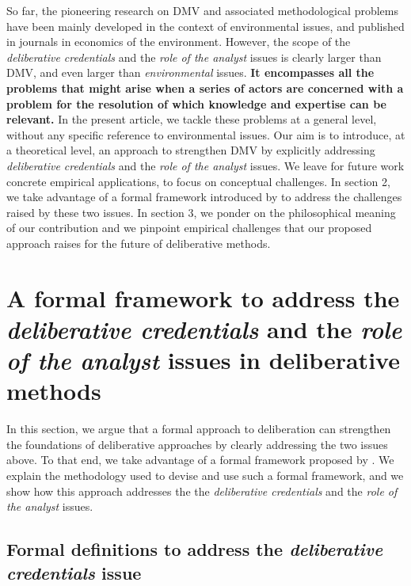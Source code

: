 \documentclass[a4paper, 11pt]{article}
\begin{document}
So far, the pioneering research on \ac{DMV} and associated methodological problems have been mainly developed in the context of environmental issues, and published in journals in economics of the environment. However, the scope of the \emph{deliberative credentials} and the \emph{role of the analyst} issues is clearly larger than \ac{DMV}, and even larger than \emph{environmental} issues. \textbf{It encompasses all the problems that might arise when a series of actors are concerned with a problem for the resolution of which knowledge and expertise can be relevant.} In the present article, we tackle these problems at a general level, without any specific reference to environmental issues. Our aim is to introduce, at a theoretical level, an approach to strengthen \ac{DMV} by explicitly addressing \emph{deliberative credentials} and the \emph{role of the analyst} issues. We leave for future work concrete empirical applications, to focus on conceptual challenges. In section 2, we take advantage of a formal framework introduced by \citet{cailloux_formal_2019} to address the challenges raised by these two issues.
In section 3, we ponder on the philosophical meaning of our contribution and we pinpoint empirical challenges that our proposed approach raises for the future of deliberative methods.

\section{A formal framework to address the \emph{deliberative credentials} and the \emph{role of the analyst} issues in deliberative methods}
In this section, we argue that a formal approach to deliberation can strengthen the foundations of deliberative approaches by clearly addressing the two issues above. To that end, we take advantage of a formal framework proposed by \citet{cailloux_formal_2019}. We explain the methodology used to devise and use such a formal framework, and we show how this approach addresses the the \emph{deliberative credentials} and the \emph{role of the analyst} issues.

\subsection{Formal definitions to address the \emph{deliberative credentials} issue}
\end{document}
